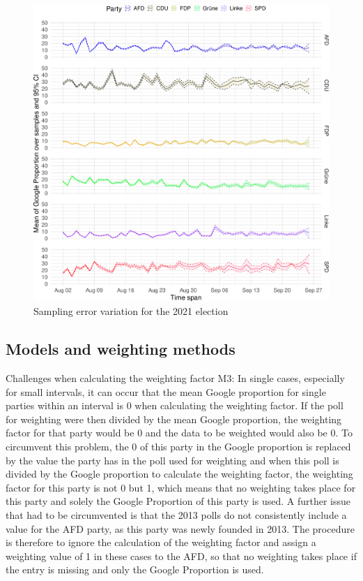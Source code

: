 \documentclass[
  letterpaper,
  DIV=11,
  numbers=noendperiod]{scrartcl}
\begin{document}
\begin{figure}[H]

\caption{\label{fig-A3}Sampling error variation for the 2021 election}

{\centering \includegraphics{figures/fig-A3-1.pdf}

}

\end{figure}

\hypertarget{models-and-weighting-methods}{%
\subsection{Models and weighting
methods}\label{models-and-weighting-methods}}

Challenges when calculating the weighting factor M3: In single cases,
especially for small intervals, it can occur that the mean Google
proportion for single parties within an interval is 0 when calculating
the weighting factor. If the poll for weighting were then divided by the
mean Google proportion, the weighting factor for that party would be 0
and the data to be weighted would also be 0. To circumvent this problem,
the 0 of this party in the Google proportion is replaced by the value
the party has in the poll used for weighting and when this poll is
divided by the Google proportion to calculate the weighting factor, the
weighting factor for this party is not 0 but 1, which means that no
weighting takes place for this party and solely the Google Proportion of
this party is used. A further issue that had to be circumvented is that
the 2013 polls do not consistently include a value for the AFD party, as
this party was newly founded in 2013. The procedure is therefore to
ignore the calculation of the weighting factor and assign a weighting
value of 1 in these cases to the AFD, so that no weighting takes place
if the entry is missing and only the Google Proportion is used.
\end{document}

